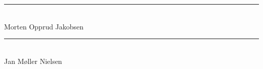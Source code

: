 \begin{minipage}{.5\textwidth}
  \begin{center}
    \vspace{1.4cm}
    \rule{0.8\textwidth}{0.1pt}\\
    \small{Morten Opprud Jakobsen\\%
    }
  \end{center}
\end{minipage}%
\begin{minipage}{0.5\textwidth}
  \begin{center}
    \vspace{1.4cm}
    \rule{0.8\textwidth}{0.1pt}\\
    \small{Jan Møller Nielsen\\%
    }
  \end{center}
\end{minipage}

